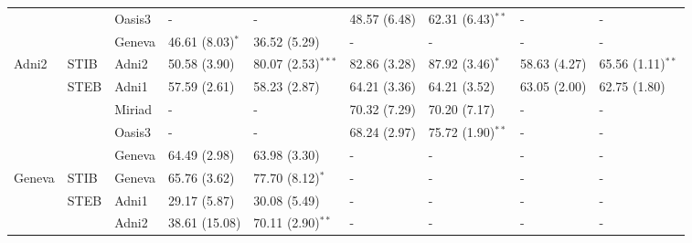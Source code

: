 \begin{table*}
{\begin{tabular}{lllllllll}
       &                 & Oasis3         &              -       &             -          &   48.57 (6.48) &   62.31 (6.43)$^{**}$ &             - &             -         \\
       &                 & Geneva         &   46.61 (8.03)$^{*}$ &  36.52 (5.29)          &              - &              -        &             - &             -         \\
\toprule
Adni2  &         STIB    & Adni2          &   50.58 (3.90)       &  80.07 (2.53)$^{***}$  &   82.86 (3.28) &   87.92 (3.46)$^{*}$  &  58.63 (4.27) &  65.56 (1.11)$^{**}$  \\
\cmidrule(lr){2-9}
       &         STEB    & Adni1          &   57.59 (2.61)       &  58.23 (2.87)          &   64.21 (3.36) &   64.21 (3.52)        &  63.05 (2.00) &  62.75 (1.80)         \\
       &                 & Miriad         &              -       &             -          &   70.32 (7.29) &   70.20 (7.17)        &             - &             -         \\
       &                 & Oasis3         &              -       &             -          &   68.24 (2.97) &   75.72 (1.90)$^{**}$ &             - &             -         \\
       &                 & Geneva         &   64.49 (2.98)       &  63.98 (3.30)          &              - &              -        &             - &             -         \\
\toprule
Geneva &         STIB    & Geneva         &   65.76 (3.62)       &  77.70 (8.12)$^{*}$    &              - &              -        &             - &             -         \\
\cmidrule(lr){2-9}
       &         STEB    & Adni1          &   29.17 (5.87)       &  30.08 (5.49)          &              - &              -        &             - &             -         \\
       &                 & Adni2          &  38.61 (15.08)       &  70.11 (2.90)$^{**}$   &              - &              -        &             - &             -         \\

\end{tabular}}
\end{table*}
